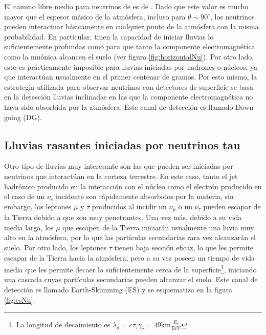 El camino libre medio para neutrinos de  es de \cite{cite:Gandhi}. 
Dado que este valor es mucho mayor que el espesor m\'asico de la atmósfera, incluso para $\theta\sim90^\circ$, los neutrinos pueden interactuar básicamente en cualquier punto de la atmósfera con la misma probabilidad.
En particular, tinen la capacidad de iniciar lluvias lo suficientemente profundas como para que tanto la componente electromagnética como la muónica alcancen el suelo (ver figura \ref{fig:horizontalNu}).
Por otro lado, esto es pr\'acticamente imposible para lluvias iniciadas por hadrones o núcleos, ya que interactúan usualmente en el primer centenar de gramos.
Por esto mismo, la estrategia utilizada para observar neutrinos con detectores de superficie se basa en la detección lluvias inclinadas en las que la componente electromagnética no haya sido absorbida por la atmósfera. Este canal de detección es llamado Down-going (DG).

%
\subsection{Lluvias rasantes iniciadas por neutrinos tau}
\label{sc:EStauInducedShowers}
%
Otro tipo de lluvias muy interesante son las que pueden ser iniciadas por neutrinos que interactúan en la corteza terrestre.
En este caso, tanto el jet hadrónico producido en la interacción con el núcleo como el electrón producido en el caso de un $\nu_e$ incidente son rápidamente absorbidos por la materia, sin embargo, los leptones $\mu$ y $\tau$ producidos al incidir un $\nu_{\mu}$ o un $\nu_{\tau}$ pueden escapar de la Tierra debido a que son muy penetrantes.
Una vez más, debido a su vida media larga, los $\mu$ que escapen de la Tierra iniciarán usualmente una luvia muy alto en la atmósfera, por lo que las partículas secundarias rara vez alcanzarán el suelo.
Por otro lado, los leptones $\tau$ tienen baja sección eficaz, lo que les permite escapar de la Tierra hacia la atmósfera, pero a su vez poseen un tiempo de vida media que les permite decaer lo suficientemente cerca de la superficie\footnote{La longitud de decaimiento es $\lambda_{d}=c\tau_{\tau}\gamma_{\tau}=49\text{km}\frac{E_{\tau}}{\text{EeV}}$}, iniciando una cascada cuyas partículas secundarias pueden alcanzar el suelo. Este canal de detección es llamado Earth-Skimming (ES) y se esquematiza en la figura \ref{fig:esNu}.

